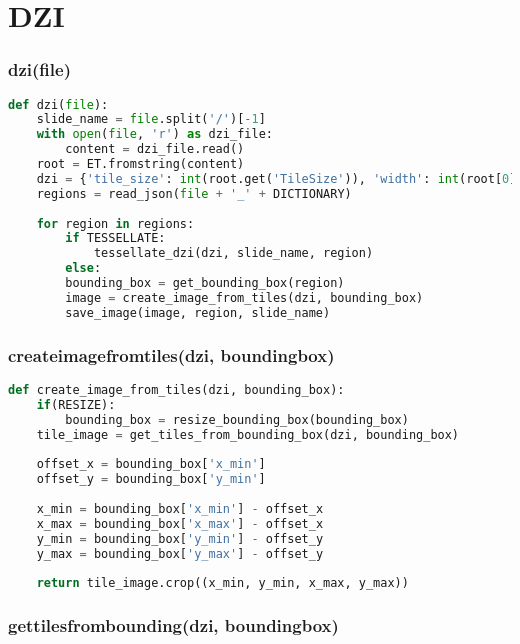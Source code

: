 \section{DZI}

\subsubsection{dzi(file)}

\begin{lstlisting}[frame=single,language=python]
def dzi(file):
	slide_name = file.split('/')[-1]
	with open(file, 'r') as dzi_file:
		content = dzi_file.read()
	root = ET.fromstring(content)
	dzi = {'tile_size': int(root.get('TileSize')), 'width': int(root[0].get('Width')), 'height': int(root[0].get('Height')), 'tile_source': get_tile_source(file), 'format': root.get('Format')}
	regions = read_json(file + '_' + DICTIONARY)
	
	for region in regions:
		if TESSELLATE:
			tessellate_dzi(dzi, slide_name, region)
		else:
		bounding_box = get_bounding_box(region)
		image = create_image_from_tiles(dzi, bounding_box)
		save_image(image, region, slide_name)
\end{lstlisting}


\subsubsection{create{\textunderscore}image{\textunderscore}from{\textunderscore}tiles(dzi, bounding{\textunderscore}box)}

\begin{lstlisting}[frame=single,language=python]
def create_image_from_tiles(dzi, bounding_box):
	if(RESIZE):
		bounding_box = resize_bounding_box(bounding_box)
	tile_image = get_tiles_from_bounding_box(dzi, bounding_box)
	
	offset_x = bounding_box['x_min']
	offset_y = bounding_box['y_min']
	
	x_min = bounding_box['x_min'] - offset_x
	x_max = bounding_box['x_max'] - offset_x
	y_min = bounding_box['y_min'] - offset_y
	y_max = bounding_box['y_max'] - offset_y
	
	return tile_image.crop((x_min, y_min, x_max, y_max))
\end{lstlisting}


\subsubsection{get{\textunderscore}tiles{\textunderscore}from{\textunderscore}bounding(dzi, bounding{\textunderscore}box)}

